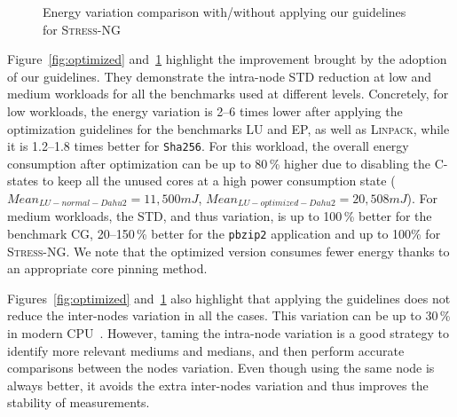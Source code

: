 \begin{figure}[htb]
    \caption{Energy variation comparison with/without applying our guidelines for \textsc{Stress-NG}}\label{fig:stress}
\end{figure}

Figure~\ref{fig:optimized} and~\ref{fig:stress} highlight the improvement brought by the adoption of our guidelines.
They demonstrate the intra-node STD reduction at low and medium workloads for all the benchmarks used at different levels.
Concretely, for low workloads, the energy variation is 2--6 times lower after applying the optimization guidelines for the benchmarks \textsf{LU} and \textsf{EP}, as well as \textsc{Linpack}, while it is 1.2--1.8 times better for \texttt{Sha256}.
For this workload, the overall energy consumption after optimization can be up to 80\,\% higher due to disabling the C-states to keep all the unused cores at a high power consumption state ($Mean_{LU-normal-Dahu2}=11,500 mJ$, $Mean_{LU-optimized-Dahu2}=20,508 mJ$).
For medium workloads, the STD, and thus variation, is up to 100\,\% better for the benchmark \textsf{CG}, 20--150\,\% better for the \texttt{pbzip2} application and up to 100\% for \textsc{Stress-NG}.
We note that the optimized version consumes fewer energy thanks to an appropriate core pinning method.

Figures~\ref{fig:optimized} and~\ref{fig:stress} also highlight that applying the guidelines does not reduce the inter-nodes variation in all the cases.
This variation can be up to 30\,\% in modern CPU~\cite{wang_experimental_nodate}.
However, taming the intra-node variation is a good strategy to identify more relevant mediums and medians, and then perform accurate comparisons between the nodes variation.
Even though using the same node is always better, it avoids the extra inter-nodes variation and thus improves the stability of measurements.


